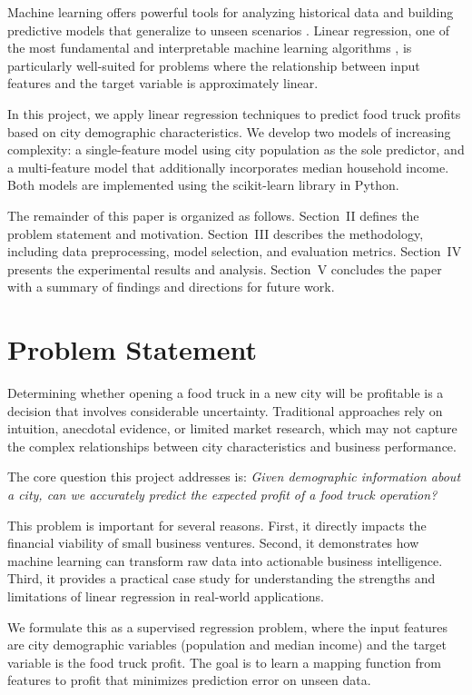 \documentclass[conference]{IEEEtran}
\begin{document}
Machine learning offers powerful tools for analyzing historical data and building predictive models that generalize to unseen scenarios \cite{b6}. Linear regression, one of the most fundamental and interpretable machine learning algorithms \cite{b7}, is particularly well-suited for problems where the relationship between input features and the target variable is approximately linear.

In this project, we apply linear regression techniques to predict food truck profits based on city demographic characteristics. We develop two models of increasing complexity: a single-feature model using city population as the sole predictor, and a multi-feature model that additionally incorporates median household income. Both models are implemented using the scikit-learn library \cite{b2} in Python.

The remainder of this paper is organized as follows. Section~II defines the problem statement and motivation. Section~III describes the methodology, including data preprocessing, model selection, and evaluation metrics. Section~IV presents the experimental results and analysis. Section~V concludes the paper with a summary of findings and directions for future work.

\section{Problem Statement}

Determining whether opening a food truck in a new city will be profitable is a decision that involves considerable uncertainty. Traditional approaches rely on intuition, anecdotal evidence, or limited market research, which may not capture the complex relationships between city characteristics and business performance.

The core question this project addresses is: \textit{Given demographic information about a city, can we accurately predict the expected profit of a food truck operation?}

This problem is important for several reasons. First, it directly impacts the financial viability of small business ventures. Second, it demonstrates how machine learning can transform raw data into actionable business intelligence. Third, it provides a practical case study for understanding the strengths and limitations of linear regression in real-world applications.

We formulate this as a supervised regression problem, where the input features are city demographic variables (population and median income) and the target variable is the food truck profit. The goal is to learn a mapping function from features to profit that minimizes prediction error on unseen data.
\end{document}
